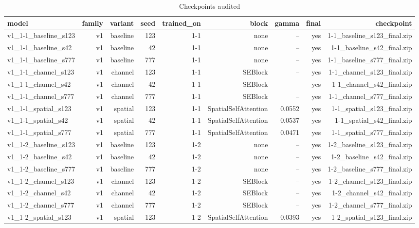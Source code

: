 \begin{table}[t]
\centering
\caption{Checkpoints audited}
\label{tab:models}
\begin{tabular}{lrrrrrrrr}
\toprule
model & family & variant & seed & trained\_on & block & gamma & final & checkpoint \\
\midrule
v1\_1-1\_baseline\_s123 & v1 & baseline & 123 & 1-1 & none & -- & yes & 1-1\_baseline\_s123\_final.zip \\
v1\_1-1\_baseline\_s42 & v1 & baseline & 42 & 1-1 & none & -- & yes & 1-1\_baseline\_s42\_final.zip \\
v1\_1-1\_baseline\_s777 & v1 & baseline & 777 & 1-1 & none & -- & yes & 1-1\_baseline\_s777\_final.zip \\
v1\_1-1\_channel\_s123 & v1 & channel & 123 & 1-1 & SEBlock & -- & yes & 1-1\_channel\_s123\_final.zip \\
v1\_1-1\_channel\_s42 & v1 & channel & 42 & 1-1 & SEBlock & -- & yes & 1-1\_channel\_s42\_final.zip \\
v1\_1-1\_channel\_s777 & v1 & channel & 777 & 1-1 & SEBlock & -- & yes & 1-1\_channel\_s777\_final.zip \\
v1\_1-1\_spatial\_s123 & v1 & spatial & 123 & 1-1 & SpatialSelfAttention & 0.0552 & yes & 1-1\_spatial\_s123\_final.zip \\
v1\_1-1\_spatial\_s42 & v1 & spatial & 42 & 1-1 & SpatialSelfAttention & 0.0537 & yes & 1-1\_spatial\_s42\_final.zip \\
v1\_1-1\_spatial\_s777 & v1 & spatial & 777 & 1-1 & SpatialSelfAttention & 0.0471 & yes & 1-1\_spatial\_s777\_final.zip \\
v1\_1-2\_baseline\_s123 & v1 & baseline & 123 & 1-2 & none & -- & yes & 1-2\_baseline\_s123\_final.zip \\
v1\_1-2\_baseline\_s42 & v1 & baseline & 42 & 1-2 & none & -- & yes & 1-2\_baseline\_s42\_final.zip \\
v1\_1-2\_baseline\_s777 & v1 & baseline & 777 & 1-2 & none & -- & yes & 1-2\_baseline\_s777\_final.zip \\
v1\_1-2\_channel\_s123 & v1 & channel & 123 & 1-2 & SEBlock & -- & yes & 1-2\_channel\_s123\_final.zip \\
v1\_1-2\_channel\_s42 & v1 & channel & 42 & 1-2 & SEBlock & -- & yes & 1-2\_channel\_s42\_final.zip \\
v1\_1-2\_channel\_s777 & v1 & channel & 777 & 1-2 & SEBlock & -- & yes & 1-2\_channel\_s777\_final.zip \\
v1\_1-2\_spatial\_s123 & v1 & spatial & 123 & 1-2 & SpatialSelfAttention & 0.0393 & yes & 1-2\_spatial\_s123\_final.zip \\

\end{tabular}
\end{table}
